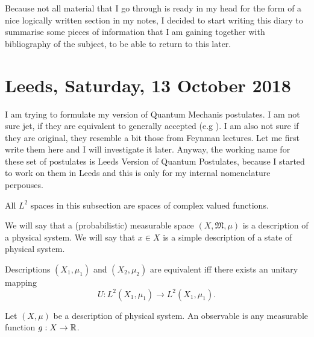 \documentclass[main.tex]{subfiles}
\begin{document}
Because not all material that I go through is ready in my head for the form of a nice logically written section in my notes, I decided to start writing this diary to summarise some pieces of information that I am gaining together with bibliography of the subject, to be able to return to this later.

\section{Leeds, Saturday, 13 October 2018}
\label{leeds_postulates}
I am trying to formulate my version of Quantum Mechanis postulates. I am not sure jet, if they are equivalent to generally accepted (e.g \cite{hall2013}). I am also not sure if they are original, they resemble a bit those from Feynman lectures. Let me first write them here and I will investigate it later. Anyway, the working name for these set of postulates is Leeds Version of Quantum Postulates, because I started to work on them in Leeds and this is only for my internal nomenclature perpouses.

All $L^2$ spaces in this subsection are spaces of complex valued functions.

\begin{definition}
We will say that a (probabilistic) measurable space $(X, \mathfrak{M}, \mu)$ is a description of a physical system. We will say that $x\in X$ is a simple description of a state of physical system.   
\end{definition}

\begin{definition}
Descriptions $(X_1, \mu_1)$ and $(X_2, \mu_2)$ are equivalent iff there exists an unitary mapping
\begin{equation}
U:L^2(X_1, \mu_1)\to L^2(X_1, \mu_1). 
\end{equation}
\end{definition}

\begin{definition}
Let $(X,\mu)$ be a description of physical system. An observable is any measurable function $g:X\to \mathbb{R}$.
\end{definition}
\end{document}
